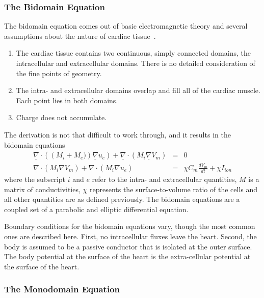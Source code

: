 \subsubsection{The Bidomain Equation}

The bidomain equation comes out of basic electromagnetic theory and several
assumptions about the nature of cardiac tissue~\cite{Tung1978,Geselowitz1983}.
\begin{enumerate}
    \item The cardiac tissue contains two continuous, simply connected domains, the intracellular and extracellular domains.
    There is no detailed consideration of the fine points of geometry.
    \item The intra- and extracellular domains overlap and fill all of the cardiac muscle. Each point lies in both domains.
    \item Charge does not accumulate.
\end{enumerate}

The derivation is not that difficult to work through, and it results in the bidomain equations
\begin{subequations}
\label{eqn:intro:math:bidom}
\begin{align}
\underline{\nabla}\cdot\left(\left(M_{i}+M_{e})\right)\underline{\nabla}u_{e}\right) + \underline{\nabla}\cdot\left( M_{i}\underline{\nabla}V_{m}\right) &=& 0
\label{eqn:intro:math:bidom1}\\
\underline{\nabla}\cdot\left(M_{i}\underline{\nabla}V_{m}\right) + \underline{\nabla}\cdot\left(M_{i}\underline{\nabla}u_{e}\right) &=& \chi C_{m}\frac{dV_{m}}{dt} + \chi{I_{ion}}
\label{eqn:intro:math:bidom2}
\end{align}
\end{subequations}
where the subscript $i$ and $e$ refer to the intra- and extracellular quantities, $M$ is a matrix of conductivities, $\chi$ represents the surface-to-volume ratio of the cells and all other quantities are as defined previously.
The bidomain equations are a coupled set of a parabolic and elliptic differential equation.

Boundary conditions for the bidomain equations vary, though the most common ones are described here.
First, no intracellular fluxes leave the heart.
Second, the body is assumed to be a passive conductor that is isolated at the outer surface.
The body potential at the surface of the heart is the extra-cellular potential at the surface of the heart.

\subsubsection{The Monodomain Equation}
\label{sec:intro:math:mono}


